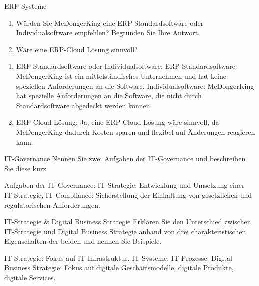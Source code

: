 \documentclass{article}
\begin{document}
\begin{exercise}{ERP-Systeme}
  \begin{enumerate}
    \item Würden Sie McDongerKing eine ERP-Standardsoftware oder Individualsoftware empfehlen? Begründen Sie Ihre Antwort.
    \item Wäre eine ERP-Cloud Lösung sinnvoll?
  \end{enumerate}

  \begin{solution}
    \begin{enumerate}
      \item ERP-Standardsoftware oder Individualsoftware: ERP-Standardsoftware: McDongerKing ist ein mittelständisches Unternehmen und hat keine speziellen Anforderungen an die Software. Individualsoftware: McDongerKing hat spezielle Anforderungen an die Software, die nicht durch Standardsoftware abgedeckt werden können.
      \item ERP-Cloud Lösung: Ja, eine ERP-Cloud Lösung wäre sinnvoll, da McDongerKing dadurch Kosten sparen und flexibel auf Änderungen reagieren kann.
    \end{enumerate}
  \end{solution}
\end{exercise}

\begin{exercise}{IT-Governance}
  Nennen Sie zwei Aufgaben der IT-Governance und beschreiben Sie diese kurz.

  \begin{solution}
    Aufgaben der IT-Governance: IT-Strategie: Entwicklung und Umsetzung einer IT-Strategie, IT-Compliance: Sicherstellung der Einhaltung von gesetzlichen und regulatorischen Anforderungen.
  \end{solution}
\end{exercise}

\begin{exercise}{IT-Strategie \& Digital Business Strategie}
  Erklären Sie den Unterschied zwischen IT-Strategie und Digital Business Strategie anhand von drei charakteristischen Eigenschaften der beiden und nennen Sie Beispiele.

  \begin{solution}
    IT-Strategie: Fokus auf IT-Infrastruktur, IT-Systeme, IT-Prozesse. Digital Business Strategie: Fokus auf digitale Geschäftsmodelle, digitale Produkte, digitale Services.
  \end{solution}
\end{exercise}
\end{document}
